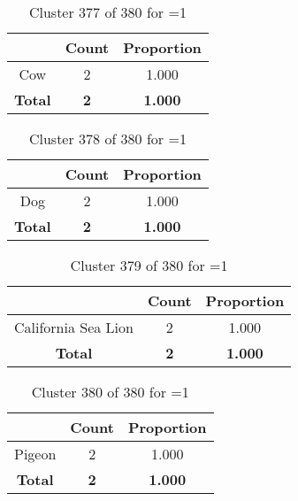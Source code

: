 \begin{table}[ht!]
\centering
\begin{tabular}{|c|c|c|}
\hline
\bf \Spec{} &\bf Count &\bf Proportion\\ \hline \hline
Cow & 2 & 1.000\\ \hline
\hline
\bf Total & \bf 2 & \bf 1.000\\ \hline
\end{tabular}
\label{tab:cluster:377:1}
\caption{Cluster 377 of 380 for \minneigh{}=1}
\end{table}

\begin{table}[ht!]
\centering
\begin{tabular}{|c|c|c|}
\hline
\bf \Spec{} &\bf Count &\bf Proportion\\ \hline \hline
Dog & 2 & 1.000\\ \hline
\hline
\bf Total & \bf 2 & \bf 1.000\\ \hline
\end{tabular}
\label{tab:cluster:378:1}
\caption{Cluster 378 of 380 for \minneigh{}=1}
\end{table}

\begin{table}[ht!]
\centering
\begin{tabular}{|c|c|c|}
\hline
\bf \Spec{} &\bf Count &\bf Proportion\\ \hline \hline
California Sea Lion & 2 & 1.000\\ \hline
\hline
\bf Total & \bf 2 & \bf 1.000\\ \hline
\end{tabular}
\label{tab:cluster:379:1}
\caption{Cluster 379 of 380 for \minneigh{}=1}
\end{table}

\clearpage
\begin{table}[ht!]
\centering
\begin{tabular}{|c|c|c|}
\hline
\bf \Spec{} &\bf Count &\bf Proportion\\ \hline \hline
Pigeon & 2 & 1.000\\ \hline
\hline
\bf Total & \bf 2 & \bf 1.000\\ \hline
\end{tabular}
\label{tab:cluster:380:1}
\caption{Cluster 380 of 380 for \minneigh{}=1}
\end{table}

